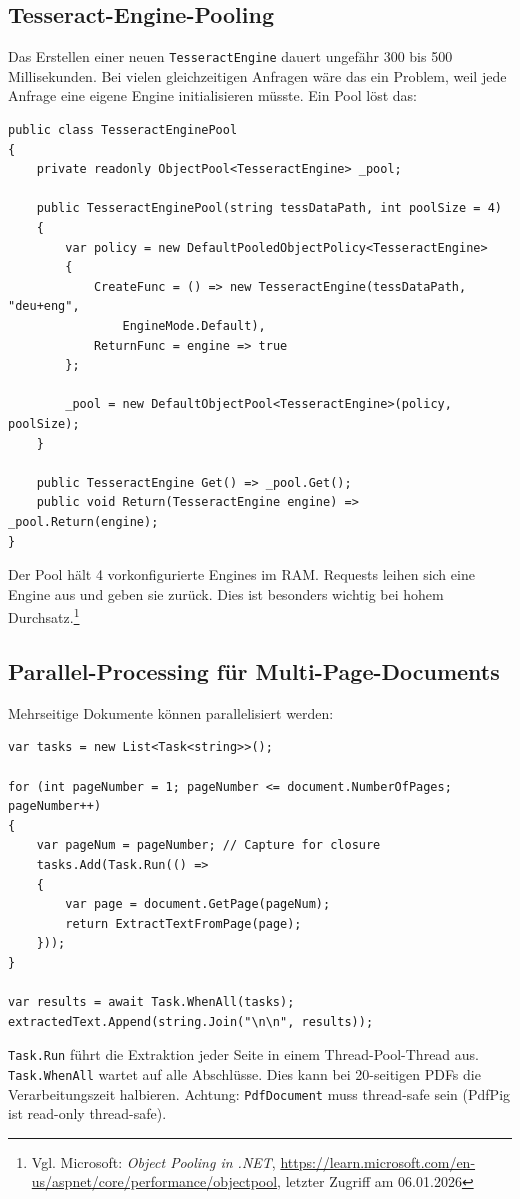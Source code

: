 \subsection{Tesseract-Engine-Pooling}
Das Erstellen einer neuen \texttt{TesseractEngine} dauert ungefähr 300 bis 500 Millisekunden. Bei vielen gleichzeitigen Anfragen wäre das ein Problem, weil jede Anfrage eine eigene Engine initialisieren müsste. Ein Pool löst das:

\begin{lstlisting}[language={[Sharp]C}, caption={TesseractEngine-Pool (Konzept)}, label={lst:engine_pool}]
public class TesseractEnginePool
{
    private readonly ObjectPool<TesseractEngine> _pool;

    public TesseractEnginePool(string tessDataPath, int poolSize = 4)
    {
        var policy = new DefaultPooledObjectPolicy<TesseractEngine>
        {
            CreateFunc = () => new TesseractEngine(tessDataPath, "deu+eng", 
                EngineMode.Default),
            ReturnFunc = engine => true
        };
        
        _pool = new DefaultObjectPool<TesseractEngine>(policy, poolSize);
    }

    public TesseractEngine Get() => _pool.Get();
    public void Return(TesseractEngine engine) => _pool.Return(engine);
}
\end{lstlisting}

Der Pool hält 4 vorkonfigurierte Engines im RAM. Requests leihen sich eine Engine aus und geben sie zurück. Dies ist besonders wichtig bei hohem Durchsatz.\footnote{Vgl. Microsoft: \textit{Object Pooling in .NET}, \url{https://learn.microsoft.com/en-us/aspnet/core/performance/objectpool}, letzter Zugriff am 06.01.2026}

\subsection{Parallel-Processing für Multi-Page-Documents}
Mehrseitige Dokumente können parallelisiert werden:

\begin{lstlisting}[language={[Sharp]C}, caption={Parallel Seiten-Extraktion (Konzept)}, label={lst:parallel_extraction}]
var tasks = new List<Task<string>>();

for (int pageNumber = 1; pageNumber <= document.NumberOfPages; pageNumber++)
{
    var pageNum = pageNumber; // Capture for closure
    tasks.Add(Task.Run(() => 
    {
        var page = document.GetPage(pageNum);
        return ExtractTextFromPage(page);
    }));
}

var results = await Task.WhenAll(tasks);
extractedText.Append(string.Join("\n\n", results));
\end{lstlisting}

\texttt{Task.Run} führt die Extraktion jeder Seite in einem Thread-Pool-Thread aus. \texttt{Task.WhenAll} wartet auf alle Abschlüsse. Dies kann bei 20-seitigen PDFs die Verarbeitungszeit halbieren. Achtung: \texttt{PdfDocument} muss thread-safe sein (PdfPig ist read-only thread-safe).
